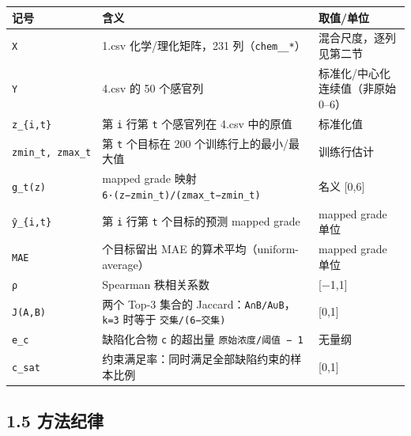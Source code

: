 \documentclass[
  11pt,
]{ctexart}
\newcounter{none} %
\begin{document}
{\def\LTcaptype{none} %
\begin{longtable}[]{@{}
  >{\raggedright\arraybackslash}p{}
  >{\raggedright\arraybackslash}p{}
  >{\raggedright\arraybackslash}p{}@{}}
\toprule\noalign{}
\begin{minipage}[b]{\linewidth}\raggedright
记号
\end{minipage} & \begin{minipage}[b]{\linewidth}\raggedright
含义
\end{minipage} & \begin{minipage}[b]{\linewidth}\raggedright
取值/单位
\end{minipage} \\
\midrule\noalign{}
\endhead
\bottomrule\noalign{}
\endlastfoot
\texttt{X} & 1.csv 化学/理化矩阵，231 列（\texttt{chem\_\_*}） &
混合尺度，逐列见第二节 \\
\texttt{Y} & 4.csv 的 50 个感官列 & 标准化/中心化连续值（非原始
0--6） \\
\texttt{z\_\{i,t\}} & 第 \texttt{i} 行第 \texttt{t} 个感官列在 4.csv
中的原值 & 标准化值 \\
\texttt{zmin\_\allowbreak{}t,\ zmax\_\allowbreak{}t} & 第 \texttt{t} 个目标在 200
个训练行上的最小/最大值 & 训练行估计 \\
\texttt{g\_t(z)} & mapped grade 映射
\texttt{6·(z−zmin\_\allowbreak{}t)/\allowbreak{}(zmax\_\allowbreak{}t−zmin\_\allowbreak{}t)} & 名义 {[}0,6{]} \\
\texttt{ŷ\_\{i,t\}} & 第 \texttt{i} 行第 \texttt{t} 个目标的预测 mapped
grade & mapped grade 单位 \\
\texttt{MAE} & 50 个目标留出 MAE 的算术平均（uniform-average） & mapped
grade 单位 \\
\texttt{ρ} & Spearman 秩相关系数 & {[}−1,1{]} \\
\texttt{J(A,B)} & 两个 Top-3 集合的
Jaccard：\texttt{\textbar{}A∩B\textbar{}/\textbar{}A∪B\textbar{}}，\texttt{k=3}
时等于 \texttt{交集/(6−交集)} & {[}0,1{]} \\
\texttt{e\_c} & 缺陷化合物 \texttt{c} 的超出量
\texttt{原始浓度/阈值\ −\ 1} & 无量纲 \\
\texttt{c\_sat} & 约束满足率：同时满足全部缺陷约束的样本比例 &
{[}0,1{]} \\
\end{longtable}
}

\subsection{1.5 方法纪律}\label{ux65b9ux6cd5ux7eaaux5f8b}
\end{document}
